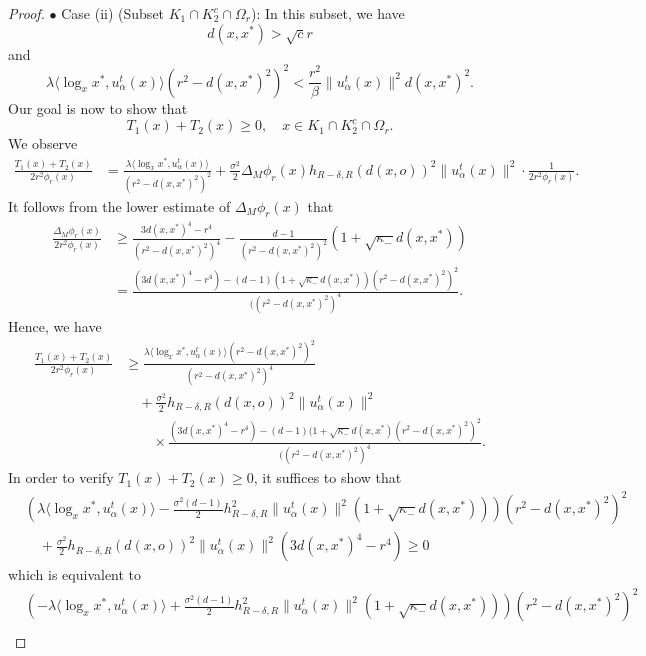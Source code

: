 \documentclass[10pt,a4paper]{amsart}
\newcommand{\dist}{d}%
\newcommand{\p}{o}%
\begin{document}
\begin{proof}
\noindent $\bullet$ Case (ii) (Subset $K_1\cap K_2^c \cap \Omega_r$):  In this subset, we have
\[
d(x,x^*)>\sqrt cr 
\]
and  
\[
\lambda \langle \log_xx^*,u_\alpha^t(x)\rangle (r^2 - d(x,x^*)^2)^2 < \frac{r^2}{\beta} \|u_\alpha^t(x)\|^2 d(x,x^*)^2 .
\]
Our goal is now to show that 
\[
T_1(x) +T_2(x) \geq0, \quad x \in K_1\cap K_2^c \cap \Omega_r.
\]
 We observe
\begin{align*}
\frac{T_1(x) + T_2(x)}{2r^2\phi_r(x)}& =   \frac{  \lambda \langle \log_xx^*,u_\alpha^t(x)\rangle }{  (r^2- d(x,x^*)^2)^2 } + \frac{\sigma^2}{2} \Delta_M \phi_r(x) h_{R-\delta,R}\left(\dist(x, \p)\right)^2 \|u_\alpha^t(x)\|^2 \cdot \frac{1}{2r^2\phi_r(x)}.
\end{align*}
It follows from the lower estimate of $\Delta_{M}\phi_r(x)$ that 
\begin{align*}
 \frac{\Delta_M \phi_r(x)}{2r^2 \phi_r(x)} &\geq \frac{  3d(x,x^*)^4-r^4 }{   (r^2 - d(x,x^*)^2)^4 }    - \frac{  d-1  }{  (r^2-d(x,x^*)^2)^2} (1+\sqrt{\kappa_-} d(x,x^*)) \\
& = \frac{     (3d(x,x^*)^4-r^4  )  -(d-1)(1+\sqrt{\kappa_-}d(x,x^*)) (r^2 - d(x,x^*)^2)^2  }{    ((r^2 - d(x,x^*)^2)^4       } .
\end{align*}
Hence, we have
\begin{align*}
\frac{T_1(x) + T_2(x)}{2r^2\phi_r(x)} & \geq \frac{  \lambda \langle \log_xx^*,u_\alpha^t(x)\rangle (r^2- d(x,x^*)^2)^2 }{  (r^2- d(x,x^*)^2)^4 } \\
&\quad + \frac{\sigma^2  }{2} h_{R-\delta,R}\left(\dist(x, \p)\right)^2 \|u_\alpha^t(x)\|^2  \\
&\quad\quad \times \frac{     (3d(x,x^*)^4-r^4  )  -(d-1)(1+\sqrt{\kappa_-}d(x,x^*) (r^2 - d(x,x^*)^2)^2  }{  (  (r^2 - d(x,x^*)^2)^4     }  .
\end{align*}
In order to verify $T_1(x)+T_2(x)\geq0$, it suffices to show that
\begin{align*}
&\left(     \lambda \langle \log_xx^*,u_\alpha^t(x)\rangle   - \frac{\sigma^2  (d-1)}{2} h_{R-\delta,R}^2\|u_\alpha^t(x)\|^2 (1+\sqrt{\kappa_-} d(x,x^*) )\right) (r^2 - d(x,x^*)^2)^2\\
& \quad + \frac{\sigma^2   }{2}  h_{R-\delta,R}\left(\dist(x, \p)\right)^2\|u_\alpha^t(x)\|^2   (3d(x,x^*)^4-r^4  )  \geq 0
\end{align*}
which is equivalent to 
\begin{align*}
&\left(    -\lambda \langle \log_xx^*,u_\alpha^t(x)\rangle   + \frac{\sigma^2   (d-1)}{2} h_{R-\delta,R}^2\|u_\alpha^t(x)\|^2 (1+\sqrt{\kappa_-} d(x,x^*) )\right) (r^2 - d(x,x^*)^2)^2 \\

\end{align*}
\end{proof}
\end{document}

